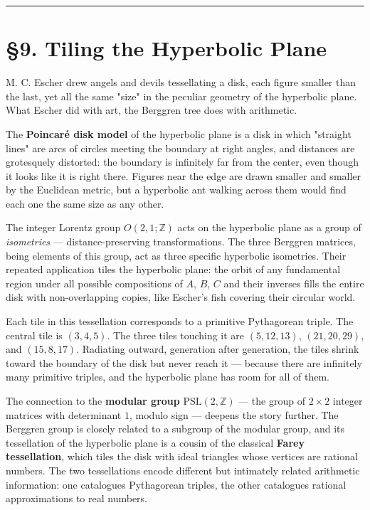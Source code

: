 \documentclass[11pt,openany]{book}
\theoremstyle{definition}
\theoremstyle{plain}
\theoremstyle{remark}
\begin{document}
\bigskip\noindent\rule{\textwidth}{0.4pt}\bigskip


\section{§9. Tiling the Hyperbolic Plane}


M. C. Escher drew angels and devils tessellating a disk, each figure smaller than the last, yet all the same "size" in the peculiar geometry of the hyperbolic plane. What Escher did with art, the Berggren tree does with arithmetic.

The \textbf{Poincaré disk model} of the hyperbolic plane is a disk in which "straight lines" are arcs of circles meeting the boundary at right angles, and distances are grotesquely distorted: the boundary is infinitely far from the center, even though it looks like it is right there. Figures near the edge are drawn smaller and smaller by the Euclidean metric, but a hyperbolic ant walking across them would find each one the same size as any other.

The integer Lorentz group $O(2,1; \mathbb{Z})$ acts on the hyperbolic plane as a group of \textit{isometries} — distance-preserving transformations. The three Berggren matrices, being elements of this group, act as three specific hyperbolic isometries. Their repeated application tiles the hyperbolic plane: the orbit of any fundamental region under all possible compositions of $A$, $B$, $C$ and their inverses fills the entire disk with non-overlapping copies, like Escher's fish covering their circular world.

Each tile in this tessellation corresponds to a primitive Pythagorean triple. The central tile is $(3, 4, 5)$. The three tiles touching it are $(5, 12, 13)$, $(21, 20, 29)$, and $(15, 8, 17)$. Radiating outward, generation after generation, the tiles shrink toward the boundary of the disk but never reach it — because there are infinitely many primitive triples, and the hyperbolic plane has room for all of them.

The connection to the \textbf{modular group} $\text{PSL}(2, \mathbb{Z})$ — the group of $2 \times 2$ integer matrices with determinant $1$, modulo sign — deepens the story further. The Berggren group is closely related to a subgroup of the modular group, and its tessellation of the hyperbolic plane is a cousin of the classical \textbf{Farey tessellation}, which tiles the disk with ideal triangles whose vertices are rational numbers. The two tessellations encode different but intimately related arithmetic information: one catalogues Pythagorean triples, the other catalogues rational approximations to real numbers.
\end{document}
